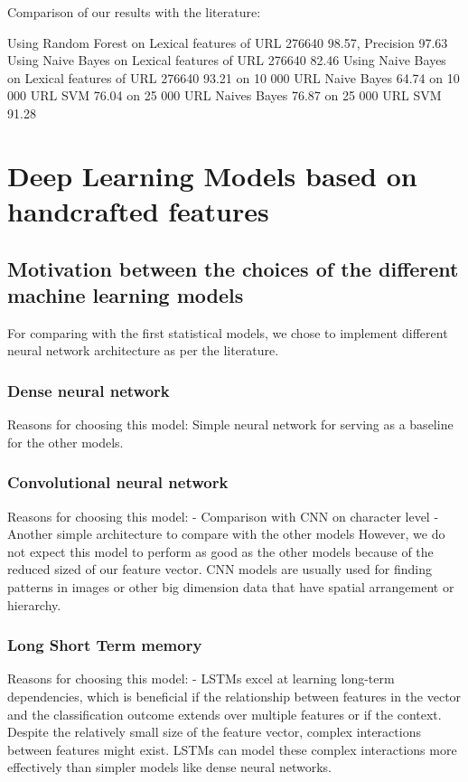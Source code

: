 \documentclass{article}
\begin{document}
    Comparison of our results with the literature:

    \cite{LexicalFeatureSelection} Using Random Forest on Lexical  features of URL 276640 98.57, Precision 97.63%
     \cite{LexicalFeatureSelection} Using Naive Bayes on Lexical  features of URL 276640 82.46
    \cite{LexicalFeatureSelection} Using Naive Bayes on Lexical  features of URL 276640 93.21
    \cite[]{PhishSafe} on 10 000 URL Naive Bayes 64.74
    \cite[]{PhishSafe} on 10 000 URL SVM 76.04
    \cite[]{PhishSafe} on 25 000 URL Naives Bayes 76.87
    \cite[]{PhishSafe} on 25 000 URL SVM 91.28
    
    \section{Deep Learning Models based on handcrafted features}\label{sec:deep-learning-models}
    
    \subsection{Motivation between the choices of the different machine learning models}\label{subsec:motivation-between-the-choices-of-the-different-machine-learning-models}
    For comparing with the first statistical models, we chose to implement different neural network architecture as per the literature.
    \subsubsection{Dense neural network}
    Reasons for choosing this model:
    Simple neural network for serving as a baseline for the other models.

    \subsubsection{Convolutional neural network}
    Reasons for choosing this model:
    - Comparison with CNN on character level
    - Another simple architecture to compare with the other models
    However, we do not expect this model to perform as good as the other models because of the reduced sized of our feature vector.
    CNN models are usually used for finding patterns in images or other big dimension data that have spatial arrangement or hierarchy.

    \subsubsection{Long Short Term memory}
    Reasons for choosing this model:
    - LSTMs excel at learning long-term dependencies, which is beneficial if the relationship between features in the vector and the classification outcome extends over multiple features or if the context.
    Despite the relatively small size of the feature vector, complex interactions between features might exist.
    LSTMs can model these complex interactions more effectively than simpler models like dense neural networks.
\end{document}
